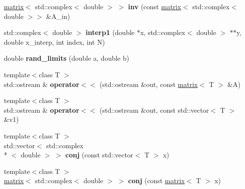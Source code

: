 \begin{DoxyCompactItemize}
\item 
\hypertarget{namespacekeycpp_a6b74369f5415c3ed45f63995149ad992}{\hyperlink{classkeycpp_1_1matrix}{matrix}$<$ std\-::complex$<$ double $>$ $>$ {\bfseries inv} (const \hyperlink{classkeycpp_1_1matrix}{matrix}$<$ std\-::complex$<$ double $>$$>$ \&A\-\_\-in)}\label{namespacekeycpp_a6b74369f5415c3ed45f63995149ad992}

\item 
\hypertarget{namespacekeycpp_af2da94e9ad9484d1b4cec8c0dca04046}{std\-::complex$<$ double $>$ {\bfseries interp1} (double $\ast$x, std\-::complex$<$ double $>$ $\ast$$\ast$y, double x\-\_\-interp, int index, int N)}\label{namespacekeycpp_af2da94e9ad9484d1b4cec8c0dca04046}

\item 
\hypertarget{namespacekeycpp_a5a75b80bd1b28390c6b9c14fc8cec713}{double {\bfseries rand\-\_\-limits} (double a, double b)}\label{namespacekeycpp_a5a75b80bd1b28390c6b9c14fc8cec713}

\item 
\hypertarget{namespacekeycpp_a55e8bada51586c0561e1b32ca1ab5f2a}{{\footnotesize template$<$class T $>$ }\\std\-::ostream \& {\bfseries operator$<$$<$} (std\-::ostream \&out, const \hyperlink{classkeycpp_1_1matrix}{matrix}$<$ T $>$ \&A)}\label{namespacekeycpp_a55e8bada51586c0561e1b32ca1ab5f2a}

\item 
\hypertarget{namespacekeycpp_a300d8f6e8992c7b33156492d884bd621}{{\footnotesize template$<$class T $>$ }\\std\-::ostream \& {\bfseries operator$<$$<$} (std\-::ostream \&out, const std\-::vector$<$ T $>$ \&v1)}\label{namespacekeycpp_a300d8f6e8992c7b33156492d884bd621}

\item 
\hypertarget{namespacekeycpp_ad26d6a2ad64185a749c6f2e85aeaf62b}{{\footnotesize template$<$class T $>$ }\\std\-::vector$<$ std\-::complex\\*
$<$ double $>$ $>$ {\bfseries conj} (const std\-::vector$<$ T $>$ x)}\label{namespacekeycpp_ad26d6a2ad64185a749c6f2e85aeaf62b}

\item 
\hypertarget{namespacekeycpp_a5cbc9dd508d193697eb9dfbef01f1404}{{\footnotesize template$<$class T $>$ }\\\hyperlink{classkeycpp_1_1matrix}{matrix}$<$ std\-::complex$<$ double $>$ $>$ {\bfseries conj} (const \hyperlink{classkeycpp_1_1matrix}{matrix}$<$ T $>$ x)}\label{namespacekeycpp_a5cbc9dd508d193697eb9dfbef01f1404}


\end{DoxyCompactItemize}
